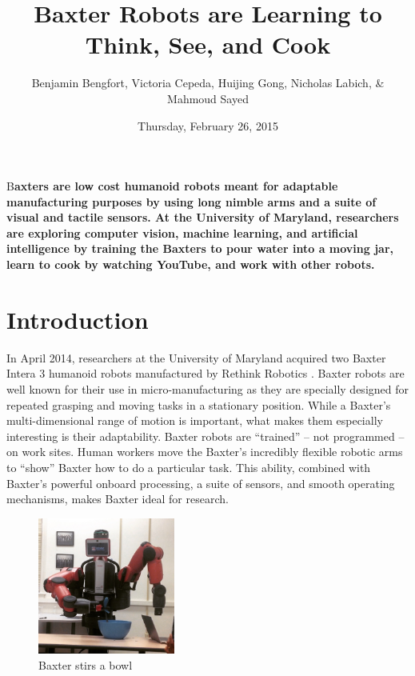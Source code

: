 \documentclass[DIV=calc, fontsize=12pt, twocolumn]{scrartcl}
\title{Baxter Robots are Learning to Think, See, and Cook} %
\author{Benjamin Bengfort, Victoria Cepeda, Huijing Gong, Nicholas Labich, \& Mahmoud Sayed  } %
\date{Thursday, February 26, 2015} %
\newcommand{\initial}[1]{ %
\lettrine[lines=3,lhang=0.3,nindent=0em]{
{\textsf{#1}}}{}}
\begin{document}
\maketitle %

\thispagestyle{fancy} %


\initial{B}\textbf{axters are low cost humanoid robots meant for adaptable manufacturing purposes by using long nimble arms and a suite of visual and tactile sensors. At the University of Maryland, researchers are exploring computer vision, machine learning, and artificial intelligence by training the Baxters to pour water into a moving jar, learn to cook by watching YouTube, and work with other robots. }


\section*{Introduction}

In April 2014, researchers at the University of Maryland acquired two Baxter Intera 3 humanoid robots manufactured by Rethink Robotics \cite{fitzgerald_developing_2013}. Baxter robots are well known for their use in micro-manufacturing as they are specially designed for repeated grasping and moving tasks in a stationary position. While a Baxter's multi-dimensional range of motion is important, what makes them especially interesting is their adaptability. Baxter robots are “trained” – not programmed – on work sites. Human workers move the Baxter’s incredibly flexible robotic arms to “show” Baxter how to do a particular task. This ability, combined with Baxter's powerful onboard processing, a suite of sensors, and smooth operating mechanisms, makes Baxter ideal for research.


\begin{figure}
	\centering
	\includegraphics[width=0.40\textwidth]{IMG_0175.jpg}
    \caption{\textsf{Baxter stirs a bowl}}
    \label{fig:stir}
    \vspace{-.35in}
\end{figure}
\end{document}
